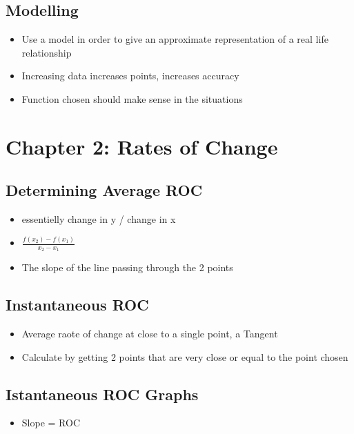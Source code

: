 \documentclass{article}
\begin{document}
    \subsection{Modelling}
    \begin{itemize}
        \item Use a model in order to give an approximate representation of a real life relationship
        \item Increasing data increases points, increases accuracy
        \item Function chosen should make sense in the situations
    \end{itemize}

    \section{Chapter 2: Rates of Change}

    \subsection{Determining Average ROC}
    \begin{itemize}
        \item essentielly change in y / change in x
        \item $\frac{f(x_2) - f(x_1)}{x_2-x_1}$
        \item The slope of the line passing through the 2 points
    \end{itemize}

    \subsection{Instantaneous ROC}
    \begin{itemize}
        \item Average raote of change at close to a single point, a Tangent
        \item Calculate by getting 2 points that are very close or equal to the point chosen
    \end{itemize}

    \subsection{Istantaneous ROC Graphs}
    \begin{itemize}
        \item Slope = ROC
    \end{itemize}
\end{document}
